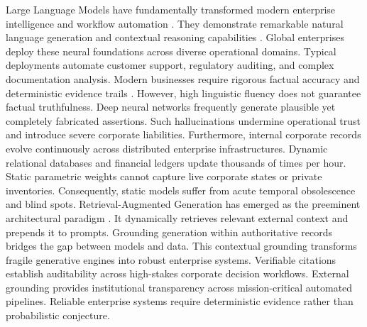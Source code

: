 \documentclass[fleqn,10pt]{article}
\begin{document}
Large Language Models have fundamentally transformed modern enterprise intelligence and workflow automation \cite{achiam2023gpt4,touvron2023llama}. They demonstrate remarkable natural language generation and contextual reasoning capabilities \cite{brown2020language,wei2022emergent}. Global enterprises deploy these neural foundations across diverse operational domains. Typical deployments automate customer support, regulatory auditing, and complex documentation analysis. Modern businesses require rigorous factual accuracy and deterministic evidence trails \cite{ji2023hallucination,huang2023survey}. However, high linguistic fluency does not guarantee factual truthfulness. Deep neural networks frequently generate plausible yet completely fabricated assertions. Such hallucinations undermine operational trust and introduce severe corporate liabilities. Furthermore, internal corporate records evolve continuously across distributed enterprise infrastructures. Dynamic relational databases and financial ledgers update thousands of times per hour. Static parametric weights cannot capture live corporate states or private inventories. Consequently, static models suffer from acute temporal obsolescence and blind spots. Retrieval-Augmented Generation has emerged as the preeminent architectural paradigm \cite{lewis2020rag,gao2023rag_survey}. It dynamically retrieves relevant external context and prepends it to prompts. Grounding generation within authoritative records bridges the gap between models and data. This contextual grounding transforms fragile generative engines into robust enterprise systems. Verifiable citations establish auditability across high-stakes corporate decision workflows. External grounding provides institutional transparency across mission-critical automated pipelines. Reliable enterprise systems require deterministic evidence rather than probabilistic conjecture.
\end{document}

